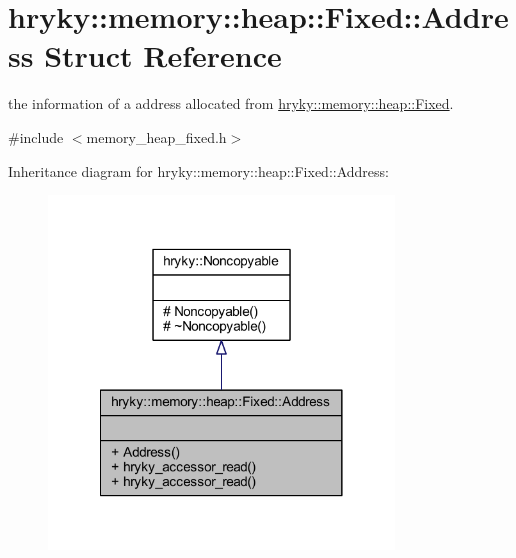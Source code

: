 \hypertarget{structhryky_1_1memory_1_1heap_1_1_fixed_1_1_address}{\section{hryky\-:\-:memory\-:\-:heap\-:\-:Fixed\-:\-:Address Struct Reference}
\label{structhryky_1_1memory_1_1heap_1_1_fixed_1_1_address}
}


the information of a address allocated from \hyperlink{classhryky_1_1memory_1_1heap_1_1_fixed}{hryky\-::memory\-::heap\-::\-Fixed}.  




{\ttfamily \#include $<$memory\-\_\-heap\-\_\-fixed.\-h$>$}



Inheritance diagram for hryky\-:\-:memory\-:\-:heap\-:\-:Fixed\-:\-:Address\-:\nopagebreak
\begin{figure}[H]
\begin{center}
\leavevmode
\includegraphics[width=260pt]{structhryky_1_1memory_1_1heap_1_1_fixed_1_1_address__inherit__graph}
\end{center}
\end{figure}
